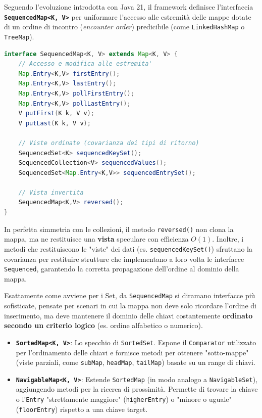 Seguendo l'evoluzione introdotta con Java 21, il framework definisce l'interfaccia \textbf{\texttt{SequencedMap<K, V>}} per uniformare l'accesso alle estremità delle mappe dotate di un ordine di incontro (\textit{encounter order}) predicibile (come \texttt{LinkedHashMap} o \texttt{TreeMap}).

\begin{lstlisting}[language=Java, caption={Metodi principali di SequencedMap}]
interface SequencedMap<K, V> extends Map<K, V> {
    // Accesso e modifica alle estremita'
    Map.Entry<K,V> firstEntry();
    Map.Entry<K,V> lastEntry();
    Map.Entry<K,V> pollFirstEntry();
    Map.Entry<K,V> pollLastEntry();
    V putFirst(K k, V v);
    V putLast(K k, V v);

    // Viste ordinate (covarianza dei tipi di ritorno)
    SequencedSet<K> sequencedKeySet();
    SequencedCollection<V> sequencedValues();
    SequencedSet<Map.Entry<K,V>> sequencedEntrySet();
    
    // Vista invertita
    SequencedMap<K,V> reversed();
}
\end{lstlisting}

\begin{observation}
In perfetta simmetria con le collezioni, il metodo \texttt{reversed()} non clona la mappa, ma ne restituisce una \textbf{vista} speculare con efficienza $O(1)$. 
Inoltre, i metodi che restituiscono le "viste" dei dati (es. \texttt{sequencedKeySet()}) sfruttano la covarianza per restituire strutture che implementano a loro volta le interfacce \texttt{Sequenced}, garantendo la corretta propagazione dell'ordine al dominio della mappa.
\end{observation}

Esattamente come avviene per i Set, da \texttt{SequencedMap} si diramano interfacce più sofisticate, pensate per scenari in cui la mappa non deve solo ricordare l'ordine di inserimento, ma deve mantenere il dominio delle chiavi costantemente \textbf{ordinato secondo un criterio logico} (es. ordine alfabetico o numerico).

\begin{itemize}
    \item \textbf{\texttt{SortedMap<K, V>}}: Lo specchio di \texttt{SortedSet}. Espone il \texttt{Comparator} utilizzato per l'ordinamento delle chiavi e fornisce metodi per ottenere "sotto-mappe" (viste parziali, come \texttt{subMap}, \texttt{headMap}, \texttt{tailMap}) basate su un range di chiavi.
    \item \textbf{\texttt{NavigableMap<K, V>}}: Estende \texttt{SortedMap} (in modo analogo a \texttt{NavigableSet}), aggiungendo metodi per la ricerca di prossimità. Permette di trovare la chiave o l'\texttt{Entry} "strettamente maggiore" (\texttt{higherEntry}) o "minore o uguale" (\texttt{floorEntry}) rispetto a una chiave target.
\end{itemize}

